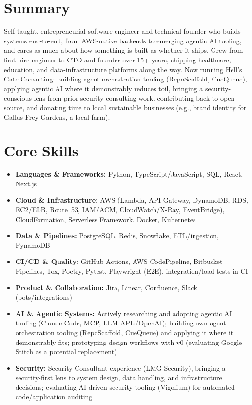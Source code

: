 \documentclass[10pt]{article}
\begin{document}


\section*{Summary}
Self-taught, entrepreneurial software engineer and technical founder who builds systems end-to-end, from AWS-native backends to emerging agentic AI tooling, and cares as much about how something is built as whether it ships. Grew from first-hire engineer to CTO and founder over 15+ years, shipping healthcare, education, and data-infrastructure platforms along the way. Now running Hell's Gate Consulting: building agent-orchestration tooling (RepoScaffold, CueQueue), applying agentic AI where it demonstrably reduces toil, bringing a security-conscious lens from prior security consulting work, contributing back to open source, and donating time to local sustainable businesses (e.g., brand identity for Gallus-Frey Gardens, a local farm).


\section*{Core Skills}
\begin{itemize}[leftmargin=*]
  \item \textbf{Languages \& Frameworks:} Python, TypeScript/JavaScript, SQL, React, Next.js
  \item \textbf{Cloud \& Infrastructure:} AWS (Lambda, API Gateway, DynamoDB, RDS, EC2/ELB, Route~53, IAM/ACM, CloudWatch/X-Ray, EventBridge), CloudFormation, Serverless Framework, Docker, Kubernetes
  \item \textbf{Data \& Pipelines:} PostgreSQL, Redis, Snowflake, ETL/ingestion, PynamoDB
  \item \textbf{CI/CD \& Quality:} GitHub Actions, AWS CodePipeline, Bitbucket Pipelines, Tox, Poetry, Pytest, Playwright (E2E), integration/load tests in CI
  \item \textbf{Product \& Collaboration:} Jira, Linear, Confluence, Slack (bots/integrations)
  \item \textbf{AI \& Agentic Systems:} Actively researching and adopting agentic AI tooling (Claude Code, MCP, LLM APIs/OpenAI); building own agent-orchestration tooling (RepoScaffold, CueQueue) and applying it where it demonstrably fits; prototyping design workflows with v0 (evaluating Google Stitch as a potential replacement)
  \item \textbf{Security:} Security Consultant experience (LMG Security), bringing a security-first lens to system design, data handling, and infrastructure decisions; evaluating AI-driven security tooling (Vigolium) for automated code/application auditing
\end{itemize}
\end{document}
